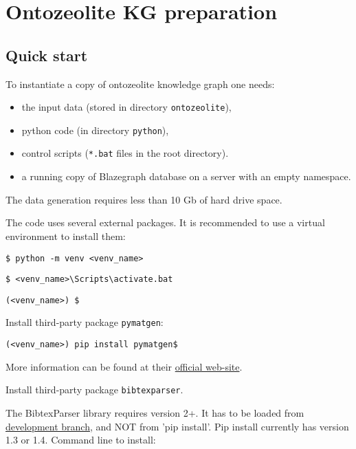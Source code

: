 \documentclass{article}
\begin{document}
\section{Ontozeolite KG preparation
}
\label{sec:zeolite_data}

\subsection{Quick start}
\label{sec:zeolite_data_quick_start}
To instantiate a copy of ontozeolite knowledge graph
one needs:

\begin{itemize}
\item
the input data (stored in directory \texttt{ontozeolite}), 

\item
python code (in directory \texttt{python}), 

\item
control scripts (\texttt{*.bat} files in the root directory).

\item
a running copy of Blazegraph database on a server with an empty namespace.
\end{itemize}

The data generation requires less than 10 Gb of hard drive space.

The code uses several external packages.
It is recommended to use a virtual environment to install them:

\hspace{1cm}
\verb|$ python -m venv <venv_name>|

\hspace{1cm}
\verb|$ <venv_name>\Scripts\activate.bat|

\hspace{1cm}
\verb|(<venv_name>) $|

Install third-party package \texttt{pymatgen}: 

\hspace{1cm}
\verb|(<venv_name>) pip install pymatgen$|

More information can be found at their 
\href{https://pymatgen.org/installation.html}{official web-site}.

Install third-party package \texttt{bibtexparser}. 

The BibtexParser library requires version 2+. It has to be loaded from
\href{https://github.com/sciunto-org/python-bibtexparser}{development branch},
and NOT from 'pip install'. 
Pip install currently has version 1.3 or 1.4.
Command line to install:
\end{document}
